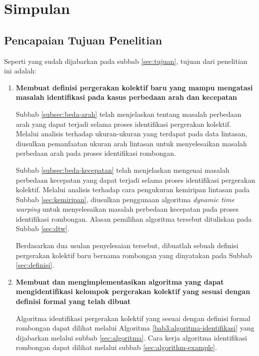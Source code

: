 \chapter{Simpulan}
\label{chap:simpulan}

\section{Pencapaian Tujuan Penelitian}
\label{sec:pencapaian-tujuan}

Seperti yang sudah dijabarkan pada subbab \ref{sec:tujuan}, tujuan dari penelitian ini adalah:

\begin{enumerate}
    \item \textbf{Membuat definisi pergerakan kolektif baru yang mampu mengatasi masalah identifikasi pada kasus perbedaan arah dan kecepatan}
    
    Subbab \ref{subsec:beda-arah} telah menjelaskan tentang masalah perbedaan arah yang dapat terjadi selama proses identifikasi pergerakan kolektif. Melalui analisis terhadap ukuran-ukuran yang terdapat pada data lintasan, diusulkan pemanfaatan ukuran arah lintasan untuk menyelesaikan masalah perbedaan arah pada proses identifikasi rombongan.
    
    Subbab \ref{subsec:beda-kecepatan} telah menjelaskan mengenai masalah perbedaan kecepatan yang dapat terjadi selama proses identifikasi pergerakan kolektif. Melalui analisis terhadap cara pengukuran kemiripan lintasan pada Subbab \ref{sec:kemiripan}, diusulkan penggunaan algoritma \textit{dynamic time warping} untuk menyelesaikan masalah perbedaan kecepatan pada proses identifikasi rombongan. Alasan pemilihan algoritma tersebut dituliskan pada Subbab \ref{sec:dtw}.
    
    Berdasarkan dua usulan penyelesaian tersebut, dibuatlah sebuah definisi pergerakan kolektif baru bernama rombongan yang dinyatakan pada Subbab \ref{sec:definisi}.
    
    \item \textbf{Membuat dan mengimplementasikan algoritma yang dapat mengidentifikasi kelompok pergerakan kolektif yang sesuai dengan definisi formal yang telah dibuat}
    
    Algoritma identifikasi pergerakan kolektif yang sesuai dengan definisi formal rombongan dapat dilihat melalui Algoritma \ref{bab3:algoritma-identifikasi} yang dijabarkan melalui subbab \ref{sec:algoritma}. Cara kerja algoritma identifikasi rombongan dapat dilihat melalui subbab \ref{sec:algorithm-example}.
    

\end{enumerate}
